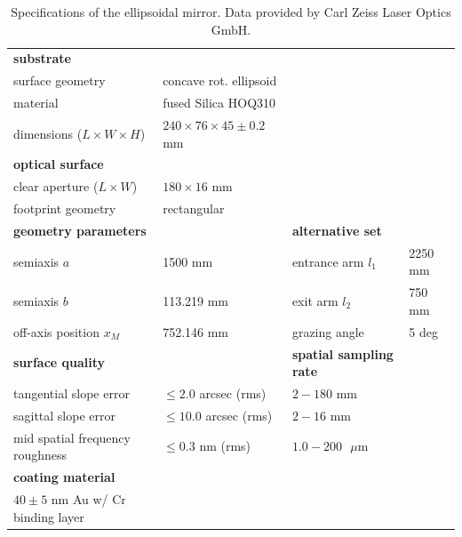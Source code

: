 \begin{table}[]
	\begin{tabular}{|llll|}
		\hline
		\textbf{substrate} &  &  &  \\
		surface geometry & concave rot. ellipsoid &  &  \\
		material & fused Silica HOQ310 &  &  \\
		dimensions ($L \times W \times H$) & $240 \times 76 \times 45 \pm 0.2$ mm &  &  \\ \hline
		\textbf{optical surface} &  &  &  \\
		clear aperture ($L \times W$) & $180 \times 16$ mm &  &  \\
		footprint geometry & rectangular &  &  \\ \hline
		\multicolumn{2}{|l|}{\textbf{geometry parameters}} & \multicolumn{2}{l|}{\textbf{alternative set}} \\
		semiaxis $a$ & \multicolumn{1}{l|}{1500 mm} & entrance arm $l_1$ & 2250 mm \\
		semiaxis $b$ & \multicolumn{1}{l|}{113.219 mm} & exit arm $l_2$ & 750 mm \\
		off-axis position $x_M$ & \multicolumn{1}{l|}{752.146 mm} & grazing angle & 5 deg \\ \hline
		\multicolumn{2}{|l|}{\textbf{surface quality}} & \textbf{spatial sampling rate} &  \\
		tangential slope error & \multicolumn{1}{l|}{$\le 2.0$ arcsec (rms)} & $2 - 180$ mm &  \\
		sagittal slope error & \multicolumn{1}{l|}{$\le 10.0$ arcsec (rms)} & $2 - 16$ mm &  \\
		mid spatial frequency roughness & \multicolumn{1}{l|}{$\le 0.3$ nm (rms)} & $1.0 - 200 \textrm{ } \mu$m &  \\ \hline
		\textbf{coating material} &  &  &  \\
		$40 \pm 5$ nm Au w/ Cr binding layer &  &  &  \\ \hline
	\end{tabular}
	\caption{Specifications of the ellipsoidal mirror. Data provided by Carl Zeiss Laser Optics GmbH.}
	\label{tab:EM_specs}
\end{table}

